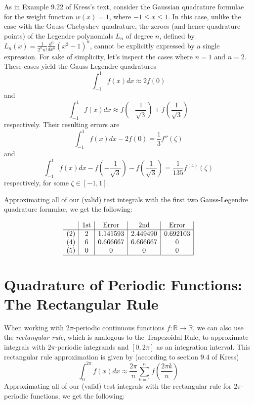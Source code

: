 \documentclass[a4paper,draft]{amsproc}
\theoremstyle{plain}
\theoremstyle{definition}
\theoremstyle{remark}
\numberwithin{equation}{section}
\begin{document}
As in Example 9.22 of Kress's text, consider the Gaussian quadrature formulae for the weight function $w(x)=1$, where $-1\leq x\leq 1$. In this case, unlike the case with the Gauss-Chebyshev quadrature, the zeroes (and hence quadrature points) of the Legendre polynomials $L_n$ of degree $n$, defined by $L_n(x)=\displaystyle\frac{1}{2^nn!}\frac{d^n}{dx^n}(x^2-1)^n$, cannot be explicitly expressed by a single expression. For sake of simplicity, let's inspect the cases where $n=1$ and $n=2$. These cases yield the Gauss-Legendre quadratures 
\[
\displaystyle\int_{-1}^{1}f(x)dx\approx 2f(0)
\]
and
\[
\displaystyle\int_{-1}^{1}f(x)dx\approx f\left(-\frac{1}{\sqrt{3}}\right)+f\left(\frac{1}{\sqrt{3}}\right)
\]
respectively. Their resulting errors are
\[
\displaystyle\int_{-1}^{1}f(x)dx-2f(0)=\frac{1}{3}f''(\zeta)
\]
and
\[
\displaystyle\int_{-1}^{1}f(x)dx-f\left(-\frac{1}{\sqrt{3}}\right)-f\left(\frac{1}{\sqrt{3}}\right)=\frac{1}{135}f^{(4)}(\zeta)
\]
respectively, for some $\zeta\in [-1, 1]$.

Approximating all of our (valid) test integrals with the first two Gauss-Legendre quadrature formulae, we get the following:

\begin{displaymath}
\begin{array}{|c|c|c|c|c|c|c}

 & \text{1st}
 & \text{Error}
 & \text{2nd}
 & \text{Error} \\
\hline
(2) & 2 & 1.141593 & 2.449490 & 0.692103 \\
(4) & 6 & 0.666667 & 6.666667 & 0 \\
(5) & 0 & 0 & 0 & 0 \\
\hline
\end{array}
\end{displaymath}

\section{Quadrature of Periodic Functions: The Rectangular Rule}

When working with $2\pi$-periodic continuous functions $f: \mathbb{R}\rightarrow\mathbb{R}$, we can also use the \emph{rectangular rule}, which is analogous to the Trapezoidal Rule, to approximate integrals with $2\pi$-periodic integrands and $[0, 2\pi]$ as an integration interval. This rectangular rule approximation is given by (according to section 9.4 of Kress)
\[
\displaystyle\int_{0}^{2\pi}f(x)dx\approx\frac{2\pi}{n}\sum_{k=1}^{n}f\left(\frac{2\pi k}{n}\right)
\]
Approximating all of our (valid) test integrals with the rectangular rule for $2\pi$-periodic functions, we get the following:
\end{document}
